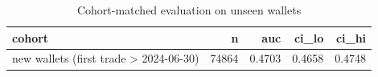 \begin{table}
\caption{Cohort-matched evaluation on unseen wallets}
\label{tab:t3_cohort_matched}
\begin{tabular}{lrrrr}
\toprule
cohort & n & auc & ci_lo & ci_hi \\
\midrule
new wallets (first trade > 2024-06-30) & 74864 & 0.4703 & 0.4658 & 0.4748 \\
\bottomrule
\end{tabular}
\end{table}
